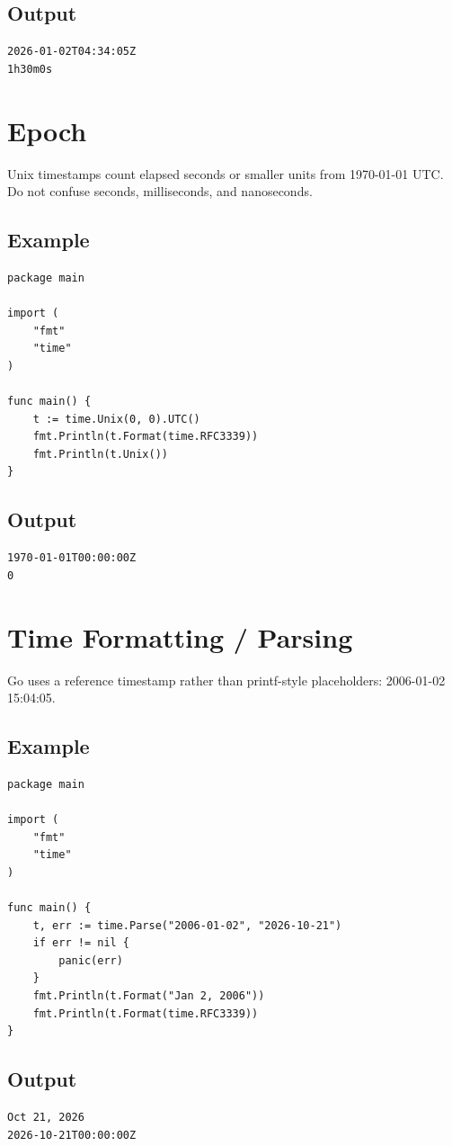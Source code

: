 \documentclass[10pt,oneside]{article}
\newcommand{\sectionline}{\par\vspace{4pt}{\color{rule}\hrule height .5pt}\vspace{7pt}\color{ink}\noindent}
\begin{document}
\subsection*{Output}
\begin{lstlisting}[style=terminal]
2026-01-02T04:34:05Z
1h30m0s
\end{lstlisting}
\clearpage
\section{Epoch}
\sectionline
Unix timestamps count elapsed seconds or smaller units from 1970-01-01 UTC. Do not confuse seconds, milliseconds, and nanoseconds.\par
\subsection*{Example}
\begin{lstlisting}[style=gocode]
package main

import (
	"fmt"
	"time"
)

func main() {
	t := time.Unix(0, 0).UTC()
	fmt.Println(t.Format(time.RFC3339))
	fmt.Println(t.Unix())
}
\end{lstlisting}
\subsection*{Output}
\begin{lstlisting}[style=terminal]
1970-01-01T00:00:00Z
0
\end{lstlisting}
\clearpage
\section{Time Formatting / Parsing}
\sectionline
Go uses a reference timestamp rather than printf-style placeholders: 2006-01-02 15:04:05.\par
\subsection*{Example}
\begin{lstlisting}[style=gocode]
package main

import (
	"fmt"
	"time"
)

func main() {
	t, err := time.Parse("2006-01-02", "2026-10-21")
	if err != nil {
		panic(err)
	}
	fmt.Println(t.Format("Jan 2, 2006"))
	fmt.Println(t.Format(time.RFC3339))
}
\end{lstlisting}
\subsection*{Output}
\begin{lstlisting}[style=terminal]
Oct 21, 2026
2026-10-21T00:00:00Z
\end{lstlisting}
\clearpage
\end{document}
